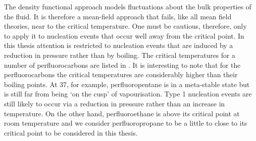 The density functional approach models fluctuations about the bulk properties of the fluid.
It is therefore a mean-field approach that fails, like all mean field theories, near to the critical temperature.
One must be cautious, therefore, only to apply it to nucleation events that occur well away from the critical point.
In this thesis  attention is restricted to nucleation events that are induced by a reduction in pressure 
rather than by boiling.
The critical temperatures for a number of perfluorocarbons are listed in .
It is interesting to note that for the perfluorocarbons the critical temperatures are considerably higher than their boiling points.
At \unit{37}\degreecelsius, for example, perfluoropentane is in a meta-stable state but is still far from being `on the cusp' of vapourisation.
Type 1 nucleation events are still likely to occur via a reduction in pressure rather than an increase in temperature.
On the other hand, perfluoroethane is above its  critical point at room temperature and we 
consider perfluoropropane to be a little to close to its  critical point to be considered in this thesis.





%



